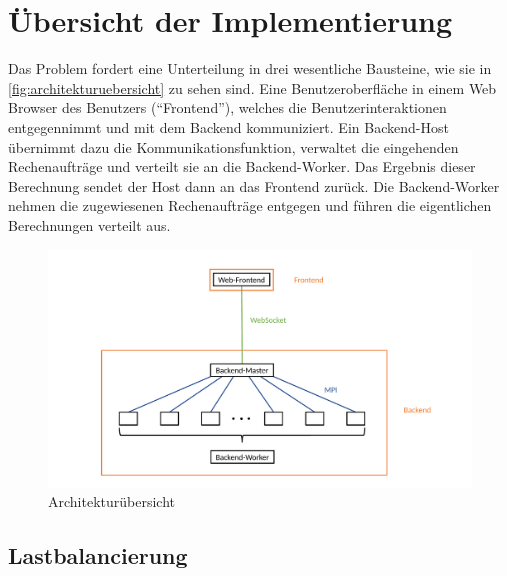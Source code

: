 






\section{Übersicht der Implementierung}

Das Problem fordert eine Unterteilung in drei wesentliche Bausteine, wie sie in \autoref{fig:architekturuebersicht} zu sehen sind.
Eine Benutzeroberfläche in einem Web Browser des Benutzers (“Frontend”), welches die Benutzerinteraktionen entgegennimmt und mit dem Backend kommuniziert.
Ein Backend-Host übernimmt dazu die Kommunikationsfunktion, verwaltet die eingehenden Rechenaufträge und verteilt sie an die Backend-Worker.
Das Ergebnis dieser Berechnung sendet der Host dann an das Frontend zurück.
Die Backend-Worker nehmen die zugewiesenen Rechenaufträge entgegen und führen die eigentlichen Berechnungen verteilt aus.

\begin{figure}
	\centering
	\includegraphics[width=0.98\linewidth]{img/Implementierung/Kommunikation.pdf}
	\caption{Architekturübersicht}
	\label{fig:architekturuebersicht}
\end{figure}

\subsection{Lastbalancierung}\label{sec:load_balancing_concepts}

